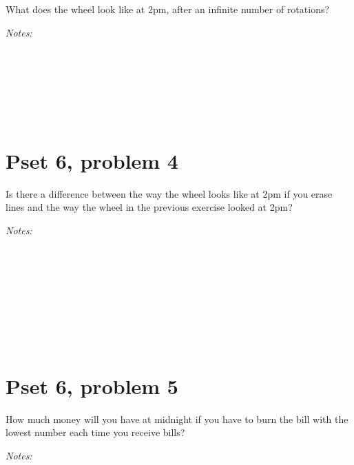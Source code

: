 \documentclass[justified]{tufte-handout}
\begin{document}
\noindent What does the wheel look like at 2pm, after an infinite number of rotations?

\noindent \emph{Notes:}  \underline{\hspace{15.4cm}}\\\\\underline{\hspace{16.43cm}}\\\\\underline{\hspace{16.43cm}}\\\\\underline{\hspace{16.43cm}}\\

\section{Pset 6, problem 4}

\noindent Is there a difference between the way the wheel looks like at 2pm if you erase lines and the way the wheel in the previous exercise looked at 2pm?

\noindent \emph{Notes:}  \underline{\hspace{15.4cm}}\\\\\underline{\hspace{16.43cm}}\\\\\underline{\hspace{16.43cm}}\\\\\underline{\hspace{16.43cm}}\\\\\underline{\hspace{16.43cm}}\\

\section{Pset 6, problem 5}

\noindent How much money will you have at midnight if you have to burn the bill with the lowest number each time you receive bills?

\noindent \emph{Notes:}  \underline{\hspace{15.4cm}}\\\\\underline{\hspace{16.43cm}}\\\\\underline{\hspace{16.43cm}}\\\\\underline{\hspace{16.43cm}}\\\\\underline{\hspace{16.43cm}}\\
\end{document}
